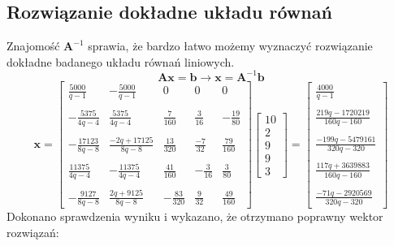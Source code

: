 \documentclass[a4paper]{article}
\begin{document}
\subsection{Rozwiązanie dokładne układu równań}
Znajomość $\textbf{A}^{-1}$ sprawia, że bardzo łatwo możemy wyznaczyć rozwiązanie dokładne badanego układu równań liniowych.
$$
\textbf{A} \textbf{x}=\textbf{b} \to \textbf{x}=\textbf{A}^{-1} \textbf{b}
$$
$$
\textbf{x}=
 \left[
\begin{array}
{ccccc}
\frac{5000}{q-1}&-\frac{5000}{q-1}&0&0&0\\ \\
-\frac{5375}{4q-4}&\frac{5375}{4q-4}&\frac{7}{160}&\frac{3}{16}&-\frac{19}{80}\\ \\
-\frac{17123}{8q-8}&\frac{-2q+17125}{8q-8}&\frac{13}{320}&\frac{-7}{32}&\frac{79}{160}\\ \\
\frac{11375}{4q-4}&-\frac{11375}{4q-4}&\frac{41}{160}&-\frac{3}{16}&\frac{3}{80}\\ \\
-\frac{9127}{8q-8}&\frac{2q+9125}{8q-8}&-\frac{83}{320}&\frac{9}{32}&\frac{49}{160}
\end{array}
\right]
\left[
\begin{array}
{c}
10\\
2\\
9\\
9\\
3
\end{array}
\right]
=
\left[
\begin{array}
{c}
\frac{4000}{q-1}\\ \\
\frac{219q-1720219}{160q-160}\\ \\
\frac{-199q-5479161}{320q-320}\\ \\
\frac{117q+3639883}{160q-160}\\ \\
\frac{-71q-2920569}{320q-320}
\end{array}
\right]
$$
Dokonano sprawdzenia wyniku i wykazano, że otrzymano poprawny wektor rozwiązań:
\end{document}

